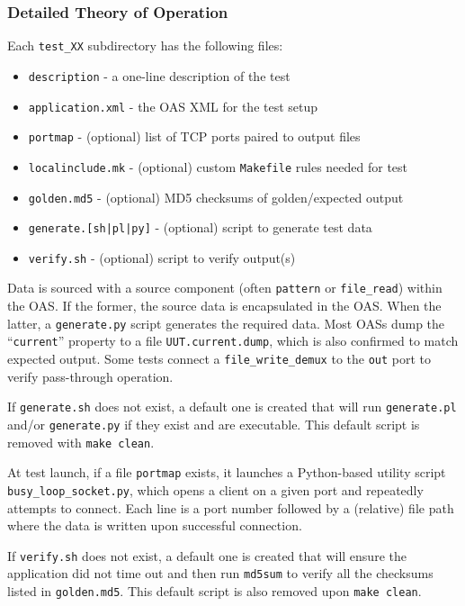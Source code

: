 \documentclass{article}
\begin{document}
\subsubsection*{Detailed Theory of Operation}
\begin{flushleft}
  Each \verb+test_XX+ subdirectory has the following files:

  \begin{itemize}{}{}
    \item \texttt{description} - a one-line description of the test
    \item \texttt{application.xml} - the OAS XML for the test setup
    \item \texttt{portmap} - (optional) list of TCP ports paired to output files
    \item \texttt{localinclude.mk} - (optional) custom \verb+Makefile+ rules needed for test
    \item \texttt{golden.md5} - (optional) MD5 checksums of golden/expected output
    \item \texttt{generate.[sh|pl|py]} - (optional) script to generate test data
    \item \texttt{verify.sh} - (optional) script to verify output(s)
  \end{itemize}

  Data is sourced with a source component (often \verb+pattern+ or \verb+file_read+) within the OAS. If the former, the source data is encapsulated in the OAS. When the latter, a \verb+generate.py+ script generates the required data. Most OASs dump the ``\texttt{current}'' property to a file \verb+UUT.current.dump+, which is also confirmed to match expected output. Some tests connect a \verb+file_write_demux+ to the \verb+out+ port to verify pass-through operation.
  \medskip

  If \texttt{generate.sh} does not exist, a default one is created that will run \texttt{generate.pl} and/or \texttt{generate.py} if they exist and are executable. This default script is removed with \verb+make clean+.
  \medskip

  At test launch, if a file \texttt{portmap} exists, it launches a Python-based utility script \verb+busy_loop_socket.py+, which opens a client on a given port and repeatedly attempts to connect. Each line is a port number followed by a (relative) file path where the data is written upon successful connection.
  \medskip

  If \texttt{verify.sh} does not exist, a default one is created that will ensure the application did not time out and then run \texttt{md5sum} to verify all the checksums listed in \texttt{golden.md5}. This default script is also removed upon \verb+make clean+.
\end{flushleft}
\end{document}
